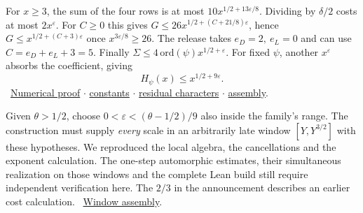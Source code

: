 \documentclass[11pt,letterpaper]{article}
\newcommand{\links}[1]{\unskip\ {\small\sffamily\color{muted}#1}}
\newcommand{\repo}{https://github.com/TomasOrtega/RH/blob/a6ac91a412dcbaab31801355ec5707024a71bf65/extracted/lean/src/}
\newcommand{\src}[3]{\href{\repo#1.lean\#L#2}{#3}}
\newcommand{\third}{Development/AutomorphicArithmetic/ThetaCorrespondence/ThetaPairLifts/ThirdPlaceSeries/}
\newcommand{\swin}{Formalism/SizeWindowBrackets/}
\newcommand{\prim}{Development/AutomorphicArithmetic/PrimitiveCosets/}
\newcommand{\eps}{\varepsilon}
\begin{document}
For \(x\ge3\), the sum of the four rows is at most \(10x^{1/2+13\eps/8}\). Dividing by \(\delta/2\) costs at most \(2x^\eps\). For \(C\ge0\) this gives \(G\le26x^{1/2+(C+21/8)\eps}\), hence \(G\le x^{1/2+(C+3)\eps}\) once \(x^{3\eps/8}\ge26\). The release takes \(e_D=2,\ e_L=0\) and can use \(C=e_D+e_L+3=5\). Finally \(\Sigma\le4\,\mathrm{ord}(\psi)x^{1/2+\eps}\). For fixed \(\psi\), another \(x^\eps\) absorbs the coefficient, giving
\[
                            \boxed{H_\psi(x)\le x^{1/2+9\eps}.}
\]
\links{\src{\swin ChainSlopeWindows/LipschitzWeightAndMinimum}{507}{Numerical proof} $\cdot$ \src{\third TopShape}{52}{constants} $\cdot$ \src{\prim SigALe}{38}{residual characters} $\cdot$ \src{\prim CoreGm}{55}{assembly}.}

Given \(\theta>1/2\), choose \(0<\eps<(\theta-1/2)/9\) also inside the family's range. The construction must supply \emph{every} scale in an arbitrarily late window \([Y,Y^{3/2}]\) with these hypotheses. We reproduced the local algebra, the cancellations and the exponent calculation. The one-step automorphic estimates, their simultaneous realization on those windows and the complete Lean build still require independent verification here. The \(2/3\) in the announcement describes an earlier cost calculation. \links{\src{\third TopPlug}{12}{Window assembly}.}
\end{document}
